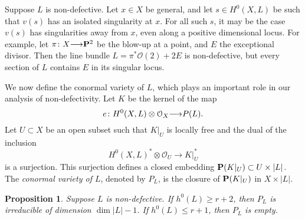 \documentclass[11pt,reqno]{amsart}
\theoremstyle{plain}
\newtheorem{proposition}[theorem]{Proposition}
\theoremstyle{definition}
\theoremstyle{remark}
\numberwithin{equation}{section}
\renewcommand{\to}{{\longrightarrow}}
\numberwithin{equation}{section}
\renewcommand{\O}{\mathcal O}
\begin{document}
\begin{remark}
  Suppose $L$ is non-defective.
  Let $x \in X$ be general, and let $s \in H^0(X, L)$ be such that $v(s)$ has an isolated singularity at $x$.
  For all such $s$, it may be the case $v(s)$ has singularities away from $x$, even along a positive dimensional locus.
  For example, let $\pi \from X \to \P^2$  be the blow-up at a point, and $E$ the exceptional divisor.
  Then the line bundle $L = \pi^*\O(2) + 2E$ is non-defective, but every section of $L$ contains $E$ in its singular locus.
\end{remark}


We now define the conormal variety of $L$, which plays an important role in our analysis of non-defectivity.
Let $K$ be the kernel of the map
\[ e \from H^0(X, L) \otimes \O_X \to P(L).\]
Let $U \subset X$ be an open subset such that $K|_U$ is locally free and the dual of the inclusion 
\[H^0(X, L)^* \otimes \O_U \to K|_U^*\]
is a surjection.
This surjection defines a closed embedding $\P(K|_U) \subset U \times |L|$.
The \emph{conormal variety of $L$}, denoted by $P_L$, is the closure of $\P(K|_U)$ in $X \times |L|$.

\begin{proposition}\label{prop:dimension}
  \label{prop:dimP}
  Suppose $L$ is non-defective.
  If $h^0(L) \geq r+2$, then $P_L$ is irreducible of dimension $\dim |L| - 1$.
  If $h^0(L) \leq r+1$, then $P_L$ is empty.
\end{proposition} 
\end{document}
